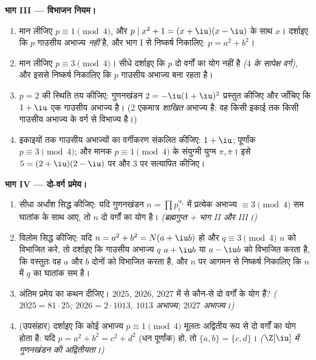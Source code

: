 \begin{problem}[{सप्ताहांत समस्या --- दो वर्गों के योग, $\Z[\iu]$ के
माध्यम से}]
\medskip
\noindent\textbf{भाग III --- विभाजन नियम।}
\begin{enumerate}[resume]
  \item मान लीजिए $p \equiv 1 \pmod 4$, और $p \mid x^2 + 1 =
        (x + \iu)(x - \iu)$ के साथ $x$। दर्शाइए कि
        $p$ गाउसीय अभाज्य \emph{नहीं} है, और भाग I से निष्कर्ष
        निकालिए: $p = a^2 + b^2$।
  \item मान लीजिए $p \equiv 3 \pmod 4$। सीधे दर्शाइए कि $p$ दो वर्गों का योग
        नहीं है \emph{($4$ के सापेक्ष वर्ग)}, और इससे निष्कर्ष
        निकालिए कि $p$ गाउसीय अभाज्य बना रहता है।
  \item $p = 2$ की स्थिति तय कीजिए: गुणनखंडन $2 =
        -\iu(1+\iu)^2$ प्रस्तुत कीजिए
        और जाँचिए कि $1 + \iu$ एक गाउसीय अभाज्य है। ($2$ एकमात्र
        \emph{शाखित} अभाज्य है: वह किसी इकाई तक किसी गाउसीय
        अभाज्य के वर्ग से विभाज्य है।)
  \item इकाइयों तक गाउसीय अभाज्यों का वर्गीकरण संकलित कीजिए:
        $1 + \iu$; पूर्णांक $p \equiv 3 \pmod 4$; और मानक $p \equiv 1 \pmod
        4$ के संयुग्मी युग्म
        $\pi, \bar\pi$। इसे $5 = (2+\iu)(2-\iu)$ पर और $3$ पर सत्यापित कीजिए।
\end{enumerate}

\medskip
\noindent\textbf{भाग IV --- दो-वर्ग प्रमेय।}
\begin{enumerate}[resume]
  \item सीधा अर्धांश सिद्ध कीजिए: यदि गुणनखंडन $n =
        \prod p_i^{\alpha_i}$ में
        प्रत्येक अभाज्य $\equiv 3 \pmod 4$ सम घातांक के साथ आए, तो $n$ दो
        वर्गों का योग है। \emph{(ब्रह्मगुप्त + भाग II और III।)}
  \item विलोम सिद्ध कीजिए: यदि $n = a^2 + b^2 = N(a + \iu b)$ हो और $q \equiv 3 \pmod 4$ $n$ को
        विभाजित करे, तो दर्शाइए कि गाउसीय अभाज्य $q$ $a + \iu b$ या
        $a - \iu b$ को विभाजित करता है, कि वस्तुतः वह $a$ और $b$
        दोनों को विभाजित करता है, और $n$ पर आगमन से निष्कर्ष
        निकालिए कि $n$ में $q$ का घातांक सम है।
  \item अंतिम प्रमेय का कथन दीजिए। $2025$, $2026$, $2027$ में से
        कौन-से दो वर्गों के योग हैं? \emph{($2025 = 81 \cdot 25$; $2026 = 2 \cdot 1013$, $1013$
        अभाज्य; $2027$ अभाज्य।)}
  \item (उपसंहार) दर्शाइए कि कोई अभाज्य $p \equiv 1 \pmod 4$ मूलतः अद्वितीय रूप
        से दो वर्गों का योग होता है: यदि $p =
        a^2 + b^2 = c^2 + d^2$ (धन पूर्णांक) हो,
        तो $\{a, b\}
        = \{c, d\}$। \emph{($\Z[\iu]$ में गुणनखंडन की अद्वितीयता।)}
\end{enumerate}


\end{problem}
